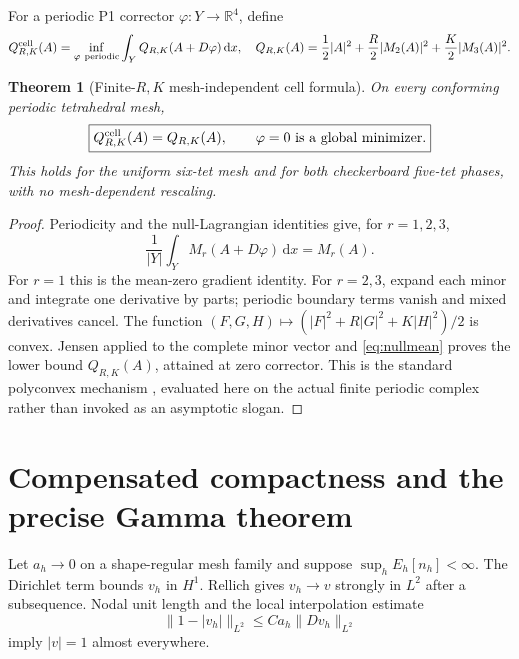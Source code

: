 \documentclass[11pt]{article}
\newtheorem{theorem}{Theorem}[section]
\newcommand{\dd}{\,\mathrm d}
\newcommand{\RR}{\mathbb R}
\begin{document}
For a periodic P1 corrector $\varphi:Y\to\RR^4$, define
\begin{equation}
 Q_{R,K}^{\rm cell}(A)=\inf_{\varphi\ \mathrm{periodic}}
 \int_Y Q_{R,K}(A+D\varphi)\dd x,
 \quad
 Q_{R,K}(A)=\frac12|A|^2+\frac R2|M_2(A)|^2+\frac K2|M_3(A)|^2.
 \label{eq:cell}
\end{equation}

\begin{theorem}[Finite-$R,K$ mesh-independent cell formula]
On every conforming periodic tetrahedral mesh,
\begin{equation}
 \boxed{Q_{R,K}^{\rm cell}(A)=Q_{R,K}(A),\qquad\varphi=0
 \text{ is a global minimizer}.}
 \label{eq:cell-result}
\end{equation}
This holds for the uniform six-tet mesh and for both checkerboard five-tet
phases, with no mesh-dependent rescaling.
\end{theorem}

\begin{proof}
Periodicity and the null-Lagrangian identities give, for $r=1,2,3$,
\begin{equation}
 \frac1{|Y|}\int_Y M_r(A+D\varphi)\dd x=M_r(A).
 \label{eq:nullmean}
\end{equation}
For $r=1$ this is the mean-zero gradient identity.  For $r=2,3$, expand each
minor and integrate one derivative by parts; periodic boundary terms vanish
and mixed derivatives cancel.  The function
$(F,G,H)\mapsto(|F|^2+R|G|^2+K|H|^2)/2$ is convex.  Jensen applied to the
complete minor vector and \eqref{eq:nullmean} proves the lower bound
$Q_{R,K}(A)$, attained at zero corrector.  This is the standard polyconvex
mechanism \cite{Ball1977}, evaluated here on the actual finite periodic
complex rather than invoked as an asymptotic slogan.
\end{proof}

\section{Compensated compactness and the precise Gamma theorem}

Let $a_h\to0$ on a shape-regular mesh family and suppose
$\sup_hE_h[n_h]<\infty$.  The Dirichlet term bounds $v_h$ in $H^1$.
Rellich gives $v_h\to v$ strongly in $L^2$ after a subsequence.  Nodal unit
length and the local interpolation estimate
\begin{equation}
 \|1-|v_h|\|_{L^2}\le C a_h\|Dv_h\|_{L^2}
 \label{eq:sphere-limit}
\end{equation}
imply $|v|=1$ almost everywhere.
\end{document}
